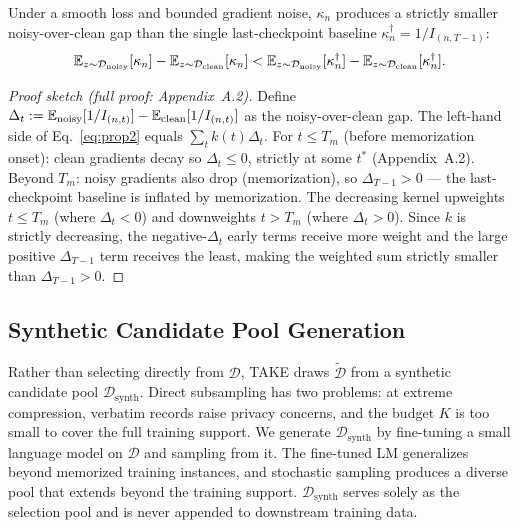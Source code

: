 \begin{foldable}
  \begin{proposition} \label{prop:traj}
    Under a smooth loss and bounded gradient noise, $\kappa_n$ produces a strictly smaller noisy-over-clean gap than the single last-checkpoint baseline $\kappa^\dagger_n = 1/I_{(n,T-1)}$:
    \begin{equation}
      \mathbb{E}_{z \sim \mathcal{D}_\textup{noisy}}[\kappa_n] - \mathbb{E}_{z \sim \mathcal{D}_\textup{clean}}[\kappa_n]
      < \mathbb{E}_{z \sim \mathcal{D}_\textup{noisy}}[\kappa^\dagger_n] - \mathbb{E}_{z \sim \mathcal{D}_\textup{clean}}[\kappa^\dagger_n].
      \label{eq:prop2}
    \end{equation}
  \end{proposition}
  \begin{proof}[Proof sketch (full proof: Appendix~A.2)]
    Define $\Delta_t := \mathbb{E}_\textup{noisy}[1/I_{(n,t)}] - \mathbb{E}_\textup{clean}[1/I_{(n,t)}]$ as the noisy-over-clean gap.
    The left-hand side of Eq.~\ref{eq:prop2} equals $\sum_t k(t)\Delta_t$.
    For $t \leq T_m$ (before memorization onset): clean gradients decay so $\Delta_t \leq 0$, strictly at some $t^*$ (Appendix~A.2).
    Beyond $T_m$: noisy gradients also drop (memorization), so $\Delta_{T-1} > 0$ — the last-checkpoint baseline is inflated by memorization.
    The decreasing kernel upweights $t \leq T_m$ (where $\Delta_t < 0$) and downweights $t > T_m$ (where $\Delta_t > 0$).
    Since $k$ is strictly decreasing, the negative-$\Delta_t$ early terms receive more weight and the large positive $\Delta_{T-1}$ term receives the least, making the weighted sum strictly smaller than $\Delta_{T-1} > 0$.
  \end{proof}
\end{foldable}

\subsection{Synthetic Candidate Pool Generation} \label{sec:04-method-pool}
\begin{foldable} %
  Rather than selecting directly from $\mathcal{D}$, TAKE draws $\tilde{\mathcal{D}}$ from a synthetic candidate pool $\mathcal{D}_\text{synth}$.
  Direct subsampling has two problems: at extreme compression, verbatim records raise privacy concerns, and the budget $K$ is too small to cover the full training support.
  We generate $\mathcal{D}_\text{synth}$ by fine-tuning a small language model on $\mathcal{D}$ and sampling from it.
  The fine-tuned LM generalizes beyond memorized training instances, and stochastic sampling produces a diverse pool that extends beyond the training support.
  $\mathcal{D}_\text{synth}$ serves solely as the selection pool and is never appended to downstream training data.
\end{foldable}

